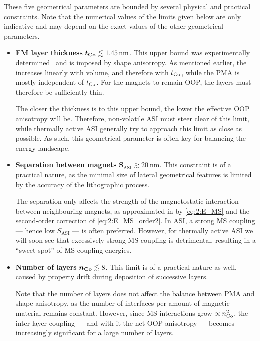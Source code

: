 These five geometrical parameters are bounded by several physical and practical constraints.
Note that the numerical values of the limits given below are only indicative and may depend on the exact values of the other geometrical parameters.
\begin{itemize}
	\item \textbf{FM layer thickness} $\boldsymbol{t_{\ce{Co}}} \lesssim \SI{1.45}{\nano\metre}$. \newline
	This upper bound was experimentally determined~\cite{KUR-24} and is imposed by shape anisotropy.
	As mentioned earlier, the  increases linearly with volume, and therefore with $t_{\ce{Co}}$, while the PMA is mostly independent of $t_{\ce{Co}}$. %
	For the magnets to remain OOP, the layers must therefore be sufficiently thin. \par
	The closer the thickness is to this upper bound, the lower the effective OOP anisotropy will be.
	Therefore, non-volatile ASI must steer clear of this limit, while thermally active ASI generally try to approach this limit as close as possible.
	As such, this geometrical parameter is often key for balancing the energy landscape.
	\item \textbf{Separation between magnets} $\boldsymbol{S_\mathrm{ASI}} \gtrsim \SI{20}{\nano\metre}$. \newline
	This constraint is of a practical nature, as the minimal size of lateral geometrical features is limited by the accuracy of the lithographic process. \par
	The separation only affects the strength of the magnetostatic interaction between neighbouring magnets, as approximated in \hotspice by \cref{eq:2:E_MS} and the second-order correction of \cref{eq:2:E_MS_order2}.
	In ASI, a strong MS coupling --- hence low $S_\mathrm{ASI}$ --- is often preferred.
	However, for thermally active ASI we will soon see that excessively strong MS coupling is detrimental, resulting in a ``sweet spot'' of MS coupling energies.
	\item \textbf{Number of layers} $\boldsymbol{n_{\ce{Co}}} \lesssim 8$. \newline
	This limit is of a practical nature as well, caused by property drift during deposition of successive layers. \par
	Note that the number of layers does not affect the balance between PMA and shape anisotropy, as the number of interfaces per amount of magnetic material remains constant.
	However, since MS interactions grow $\propto n_{\ce{Co}}^2$, the inter-layer coupling --- and with it the net OOP anisotropy --- becomes increasingly significant for a large number of layers.

\end{itemize}
